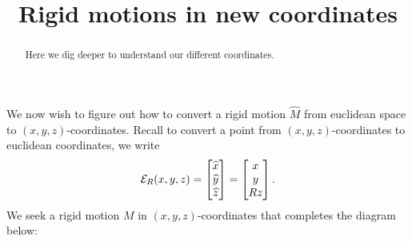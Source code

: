 \documentclass[newpage,hints,handout,noauthor,nooutcomes,12pt]{ximera}
\title{Rigid motions in new coordinates}
\begin{document}
\begin{abstract}
  Here we dig deeper to understand our different coordinates.
\end{abstract}
\maketitle

We now wish to figure out how to convert a rigid motion $\hat M$ from
euclidean space to $(x,y,z)$-coordinates. Recall to convert a point
from $(x,y,z)$-coordinates to euclidean coordinates, we write
\[
\toE(x,y,z)=
\begin{bmatrix}
\hat{x} \\ \hat{y} \\ \hat{z}%
\end{bmatrix}
=\begin{bmatrix}
  x \\ y \\ Rz
\end{bmatrix}.
\]
We seek a rigid motion $M$ in $(x,y,z)$-coordinates that completes the diagram below:
\begin{center}
\end{center}
\end{document}
